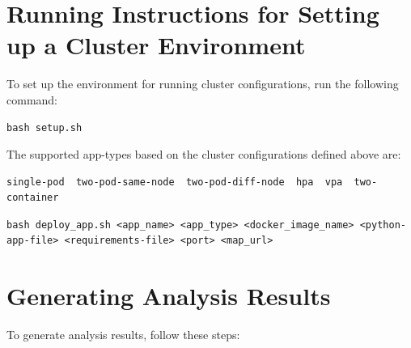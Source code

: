 \documentclass{article}
\begin{document}
\section{Running Instructions for Setting up a Cluster Environment}
To set up the environment for running cluster configurations, run the following command:

\begin{verbatim}
bash setup.sh
\end{verbatim}

The supported app-types based on the cluster configurations defined above are:

\begin{verbatim}
single-pod  two-pod-same-node  two-pod-diff-node  hpa  vpa  two-container
\end{verbatim}


\begin{verbatim}
bash deploy_app.sh <app_name> <app_type> <docker_image_name> <python-app-file> <requirements-file> <port> <map_url>
\end{verbatim}

\section{Generating Analysis Results}
To generate analysis results, follow these steps:
\end{document}
